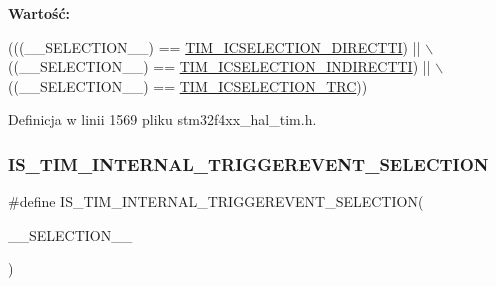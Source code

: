 {\bfseries Wartość\+:}
\begin{DoxyCode}
(((\_\_SELECTION\_\_) == \hyperlink{group___t_i_m___input___capture___selection_gac3be2fd9c576e84e0ebcfc7b3c0773a3}{TIM\_ICSELECTION\_DIRECTTI}) || \(\backslash\)
                                            ((\_\_SELECTION\_\_) == 
      \hyperlink{group___t_i_m___input___capture___selection_gab9754d4318abcd7fe725e3ee2e4496d4}{TIM\_ICSELECTION\_INDIRECTTI}) || \(\backslash\)
                                            ((\_\_SELECTION\_\_) == 
      \hyperlink{group___t_i_m___input___capture___selection_ga9e0191bbf1a82dd9150b9283c39276e7}{TIM\_ICSELECTION\_TRC}))
\end{DoxyCode}


Definicja w linii 1569 pliku stm32f4xx\+\_\+hal\+\_\+tim.\+h.

\mbox{\label{group___t_i_m___private___macros_ga48eee98612db56131414fdacc7a5743d}} 
\subsubsection{\texorpdfstring{I\+S\+\_\+\+T\+I\+M\+\_\+\+I\+N\+T\+E\+R\+N\+A\+L\+\_\+\+T\+R\+I\+G\+G\+E\+R\+E\+V\+E\+N\+T\+\_\+\+S\+E\+L\+E\+C\+T\+I\+ON}{IS\_TIM\_INTERNAL\_TRIGGEREVENT\_SELECTION}}
{\footnotesize\ttfamily \#define I\+S\+\_\+\+T\+I\+M\+\_\+\+I\+N\+T\+E\+R\+N\+A\+L\+\_\+\+T\+R\+I\+G\+G\+E\+R\+E\+V\+E\+N\+T\+\_\+\+S\+E\+L\+E\+C\+T\+I\+ON(\begin{DoxyParamCaption}\item[{}]{\+\_\+\+\_\+\+S\+E\+L\+E\+C\+T\+I\+O\+N\+\_\+\+\_\+ }\end{DoxyParamCaption})}

